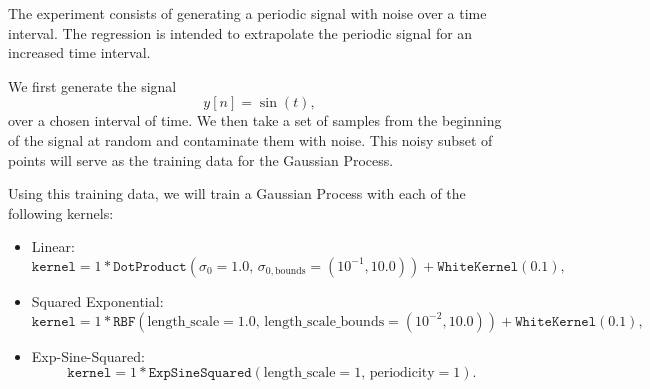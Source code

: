 \documentclass[11pt]{article}
\begin{document}
	\medskip
	The experiment consists of generating a periodic signal with noise over a time interval. The regression is intended to extrapolate the periodic signal for an increased time interval.
	
	We first generate the signal
	\[
	y[n] = \sin(t),
	\]
	over a chosen interval of time. We then take a set of samples from the beginning of the signal at random and contaminate them with noise. This noisy subset of points will serve as the training data for the Gaussian Process.
	
	Using this training data, we will train a Gaussian Process with each of the following kernels:
	\begin{itemize}
		\item Linear:
		\[
		\texttt{kernel} = 1 * \texttt{DotProduct}(\sigma_0 = 1.0,\, \sigma_{0,\text{bounds}} = (10^{-1}, 10.0)) + \texttt{WhiteKernel}(0.1),
		\]
		\item Squared Exponential:
		\[
		\texttt{kernel} = 1 * \texttt{RBF}(\text{length\_scale} = 1.0,\, \text{length\_scale\_bounds} = (10^{-2}, 10.0)) + \texttt{WhiteKernel}(0.1),
		\]
		\item Exp-Sine-Squared:
		\[
		\texttt{kernel} = 1 * \texttt{ExpSineSquared}(\text{length\_scale} = 1,\, \text{periodicity} = 1).
		\]
	\end{itemize}
	
\end{document}
